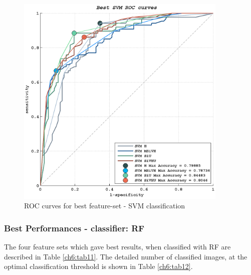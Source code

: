 \begin{figure}[!ht]
  \centering
      \includegraphics[width=0.90\textwidth]{./images/Ch6/Fig6/SVM_ROC_best_crop.png}
    \caption{ROC curves for best feature-set - SVM classification}
    \label{ch6:fig6}
\end{figure}



\vspace{0.5cm}

\subsubsection{Best Performances - classifier: RF}

The four feature sets which gave best results, when classified with \Gls{RF} are described in Table \ref{ch6:tab11}. The detailed number of classified images,
at the optimal classification threshold is shown in Table \ref{ch6:tab12}.



